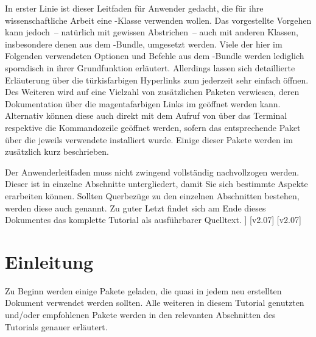 \documentclass[%
  english,ngerman,%
  cdgeometry=no,DIV=12,%
  cd=false,cdfont=false,cdtitle=true,%
  headings=normal,%
  automark,%
  listof=toc,%
]{tudscrartcl}
\begin{document}
  In erster Linie ist dieser Leitfaden für Anwender gedacht, die für ihre
  wissenschaftliche Arbeit eine \TUDScript-Klasse verwenden wollen. Das 
  vorgestellte Vorgehen kann jedoch~-- natürlich mit gewissen Abstrichen~-- 
  auch mit anderen Klassen, insbesondere denen aus dem \KOMAScript-Bundle, 
  umgesetzt werden. Viele der hier im Folgenden verwendeten Optionen und
  Befehle aus dem \TUDScript-Bundle werden lediglich sporadisch in ihrer 
  Grundfunktion erläutert. Allerdings lassen sich detaillierte Erläuterung 
  über die türkisfarbigen Hyperlinks zum  
  jederzeit sehr einfach öffnen. Des Weiteren wird auf eine Vielzahl von 
  zusätzlichen Paketen verwiesen, deren Dokumentation über die magentafarbigen 
  Links im \CTAN geöffnet werden kann. Alternativ können diese auch direkt mit 
  dem Aufruf von  über das Terminal respektive die 
  Kommandozeile geöffnet werden, sofern das entsprechende Paket über die 
  jeweils verwendete \Distro* installiert wurde. Einige dieser Pakete werden im 
   zusätzlich kurz beschrieben.
  
  Der Anwenderleitfaden muss nicht zwingend vollständig nachvollzogen werden. 
  Dieser ist in einzelne Abschnitte untergliedert, damit Sie sich bestimmte 
  Aspekte erarbeiten können. Sollten Querbezüge zu den einzelnen Abschnitten 
  bestehen, werden diese auch genannt. Zu guter Letzt findet sich am Ende 
  dieses Dokumentes das komplette Tutorial als ausführbarer Quelltext. 
]
\tableofcontents
{}[v2.07]
[v2.07]
\clearpage


\section{%
  Einleitung%
  \label{sec:introduction}%
}

Zu Beginn werden einige Pakete geladen, die quasi in jedem neu erstellten 
Dokument verwendet werden sollten. Alle weiteren in diesem Tutorial genutzten 
und/oder empfohlenen Pakete werden in den relevanten Abschnitten des Tutorials 
genauer erläutert.
\end{document}
